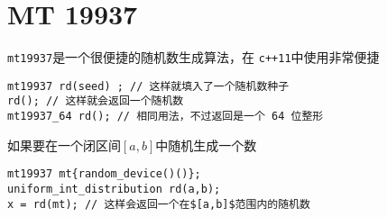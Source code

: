 \section{MT 19937}
\verb|mt19937|是一个很便捷的随机数生成算法，在 \verb|c++11|中使用非常便捷
\begin{lstlisting}
mt19937 rd(seed) ; // 这样就填入了一个随机数种子
rd(); // 这样就会返回一个随机数
mt19937_64 rd(); // 相同用法，不过返回是一个 64 位整形
\end{lstlisting}
如果要在一个闭区间$[a,b]$中随机生成一个数
\begin{lstlisting}
mt19937 mt{random_device()()};
uniform_int_distribution rd(a,b);
x = rd(mt); // 这样会返回一个在$[a,b]$范围内的随机数
\end{lstlisting}